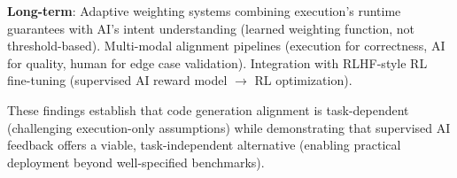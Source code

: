 \textbf{Long-term}: Adaptive weighting systems combining execution's runtime guarantees with AI's intent understanding (learned weighting function, not threshold-based). Multi-modal alignment pipelines (execution for correctness, AI for quality, human for edge case validation). Integration with RLHF-style RL fine-tuning (supervised AI reward model $\rightarrow$ RL optimization).

These findings establish that code generation alignment is task-dependent (challenging execution-only assumptions) while demonstrating that supervised AI feedback offers a viable, task-independent alternative (enabling practical deployment beyond well-specified benchmarks).
